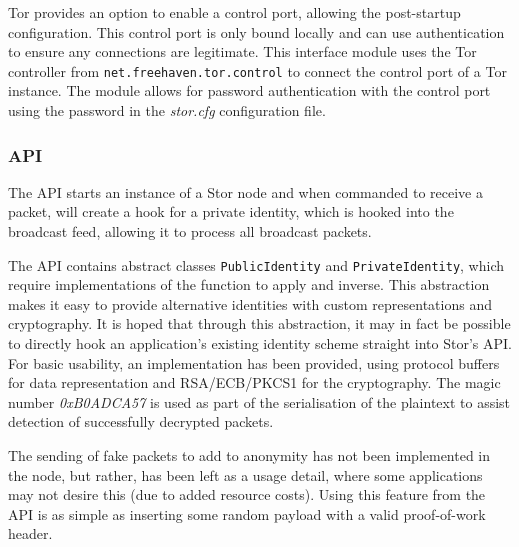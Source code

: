 			Tor provides an option to enable a control port, allowing the post-startup configuration. This control port is only bound locally and can use authentication to ensure any connections are legitimate. This interface module uses the Tor controller from \texttt{net.freehaven.tor.control} to connect the control port of a Tor instance. The module allows for password authentication with the control port using the password in the \textit{stor.cfg} configuration file.
		\subsubsection*{API}
			The API starts an instance of a Stor node and when commanded to receive a packet, will create a hook for a private identity, which is hooked into the broadcast feed, allowing it to process all broadcast packets.
			
			The API contains abstract classes \texttt{PublicIdentity} and \texttt{PrivateIdentity}, which require implementations of the function to apply and inverse. This abstraction makes it easy to provide alternative identities with custom representations and cryptography. It is hoped that through this abstraction, it may in fact be possible to directly hook an application's existing identity scheme straight into Stor's API. For basic usability, an implementation has been provided, using protocol buffers for data representation and RSA/ECB/PKCS1 for the cryptography. The magic number \textit{0xB0ADCA57} is used as part of the serialisation of the plaintext to assist detection of successfully decrypted packets.
			
			The sending of fake packets to add to anonymity has not been implemented in the node, but rather, has been left as a usage detail, where some applications may not desire this (due to added resource costs). Using this feature from the API is as simple as inserting some random payload with a valid proof-of-work header.
